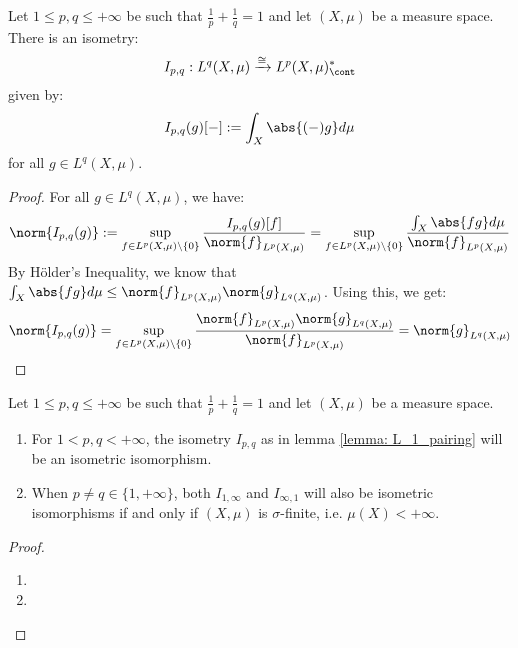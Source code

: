         \begin{lemma} \label{lemma: L_1_pairing}
            Let $1 \leq p, q \leq +\infty$ be such that $\frac1p + \frac1q = 1$ and let $(X, \mu)$ be a measure space. There is an isometry:
                $$I_{p, q}: L^q(X, \mu) \xrightarrow[]{\cong} L^p(X, \mu)^*_{\cont}$$
            given by:
                $$I_{p, q}(g)[-] := \int_X \abs{(-) g} d\mu$$
            for all $g \in L^q(X, \mu)$.
        \end{lemma}
            \begin{proof}
                For all $g \in L^q(X, \mu)$, we have:
                    $$\norm{I_{p, q}(g)} := \sup_{f \in L^p(X, \mu) \setminus \{0\}} \frac{ I_{p, q}(g)[f] }{\norm{f}_{L^p(X, \mu)}} = \sup_{f \in L^p(X, \mu) \setminus \{0\}} \frac{ \int_X \abs{fg} d\mu }{\norm{f}_{L^p(X, \mu)}}$$
                By H\"older's Inequality, we know that $\int_X \abs{fg} d\mu \leq \norm{f}_{L^p(X, \mu)} \norm{g}_{L^q(X, \mu)}$. Using this, we get:
                    $$\norm{I_{p, q}(g)} = \sup_{f \in L^p(X, \mu) \setminus \{0\}} \frac{ \norm{f}_{L^p(X, \mu)} \norm{g}_{L^q(X, \mu)} }{\norm{f}_{L^p(X, \mu)}} = \norm{g}_{L^q(X, \mu)}$$ 
            \end{proof}
        \begin{theorem} \label{theorem: L_p_space_duality}
            Let $1 \leq p, q \leq +\infty$ be such that $\frac1p + \frac1q = 1$ and let $(X, \mu)$ be a measure space.
            \begin{enumerate}
                \item For $1 < p, q < +\infty$, the isometry $I_{p, q}$ as in lemma \ref{lemma: L_1_pairing} will be an isometric isomorphism.
                \item When $p \not = q \in \{1, +\infty\}$, both $I_{1, \infty}$ and $I_{\infty, 1}$ will also be isometric isomorphisms if and only if $(X, \mu)$ is $\sigma$-finite, i.e. $\mu(X) < +\infty$.
            \end{enumerate}
        \end{theorem}
            \begin{proof}
                \begin{enumerate}
                    \item 
                    \item 
                \end{enumerate}
            \end{proof}
            
